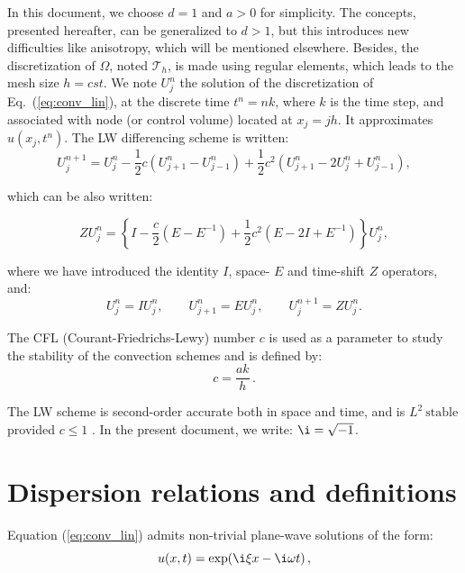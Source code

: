 \noindent In this document, we choose $d=1$ and $a>0$ for simplicity. The concepts, presented hereafter, can be generalized to $d>1$, but this introduces new difficulties like anisotropy, which will be mentioned elsewhere. Besides, the discretization of $\Omega$, noted $\mathcal{T}_h$, is made using regular elements, which leads to the mesh size $h = cst$. We note $U^n_j$ the solution of the discretization of Eq.~(\ref{eq:conv_lin}), at the discrete time $t^n = nk$, where $k$ is the time step, and associated with node (or control volume) located at $x_j = jh$. It approximates $u(x_j,t^n)$. The LW differencing scheme is written\cite{Leveque:2002}:
\begin{equation}
\label{eq:LW}
U_{j}^{n+1} = U_{j}^{n} - \frac{1}{2} c \left(U_{j+1}^{n} - U_{j-1}^{n}\right) + \frac{1}{2} c^2 \left(U_{j+1}^{n} - 2 U_{j}^{n} + U_{j-1}^{n}\right),
\end{equation}

\noindent which can be also written:

\begin{equation}
\label{eq:LW_carac}
Z U_{j}^{n}  = \left\{ I - \frac{c}{2} \left(E - E^{-1}\right) + \frac{1}{2} c^2 \left(E - 2I + E^{-1}\right) \right\} U_{j}^{n}, 
\end{equation}

\noindent where we have introduced the identity $I$, space- $E$ and time-shift $Z$ operators, and: \\
$$U_{j}^{n} = I U_{j}^{n}, \quad\quad  U_{j+1}^{n} = E U_{j}^{n},  \quad\quad U_{j}^{n+1} = Z U_{j}^{n}.$$

\noindent The CFL (Courant-Friedrichs-Lewy) number $c$ is used as a parameter to study the stability of the convection schemes and is defined by:
$$c = \frac{a k}{h} \, .$$

\noindent The LW scheme is second-order accurate both in space and time, and is $L^2 \ \mathrm{stable}$ provided $c \leq 1$ \cite{Hirsch:1988}. In the present document, we write: $\i = \sqrt{-1}$.


\section{Dispersion relations and definitions \label{sec:disper}}
\noindent Equation (\ref{eq:conv_lin}) admits non-trivial plane-wave solutions of the form:
\begin{equation}
\label{eq:plane_wave}
u(x, t) = \exp(\i \xi x - \i \omega t) \, ,
\end{equation}


